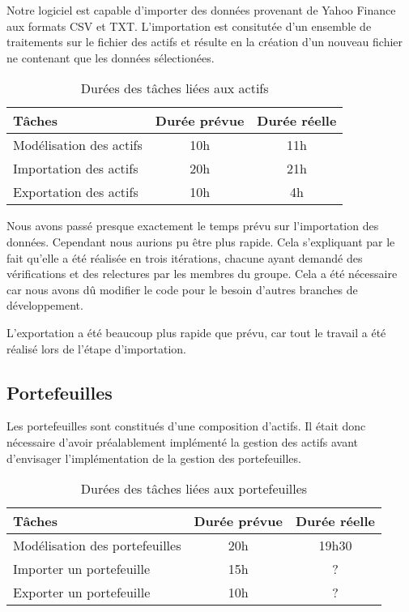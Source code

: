\documentclass[a4paper]{report}
\begin{document}
Notre logiciel est capable d'importer des données provenant de Yahoo Finance aux formats CSV et TXT.
L'importation est consitutée d'un ensemble de traitements sur le fichier des actifs et résulte en la création d'un nouveau fichier ne contenant que les données sélectionées.

\begin{table}[H]
\centering
  \begin{tabularx}{0.8\textwidth}{| X | c | c |}
    \hline
	Tâches & Durée prévue & Durée réelle\\
    \hline
    Modélisation des actifs & 10h & 11h\\
    Importation des actifs & 20h & 21h\\
    Exportation des actifs & 10h & 4h\\
    \hline
  \end{tabularx}
  \caption{Durées des tâches liées aux actifs}
\end{table}

Nous avons passé presque exactement le temps prévu sur l'importation des données.
Cependant nous aurions pu être plus rapide.
Cela s'expliquant par le fait qu'elle a été réalisée en trois itérations, chacune ayant demandé des vérifications et des relectures par les membres du groupe.
Cela a été nécessaire car nous avons dû modifier le code pour le besoin d'autres branches de développement.

L'exportation a été beaucoup plus rapide que prévu, car tout le travail a été réalisé lors de l'étape d'importation.

\subsection{Portefeuilles}
Les portefeuilles sont constitués d'une composition d'actifs.
Il était donc nécessaire d'avoir préalablement implémenté la gestion des actifs avant d'envisager l'implémentation de la gestion des portefeuilles.

\begin{table}[H]
\centering
  \begin{tabularx}{0.8\textwidth}{| X | c | c |}
    \hline
	Tâches & Durée prévue & Durée réelle \\
    \hline
     Modélisation des portefeuilles &  20h & 19h30\\
     Importer un portefeuille &  15h & ?\\
     Exporter un portefeuille &  10h & ?\\
    \hline
  \end{tabularx}
  \caption{Durées des tâches liées aux portefeuilles}
\end{table}
\end{document}
